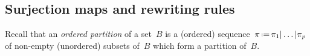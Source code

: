 \documentclass{amsart}
\theoremstyle{definition}
\newtheorem{definition}[theorem]{Definition}
\newcommand{\ssm}{\smallsetminus} %
\newcommand{\eqdef}{\mbox{\,\raisebox{0.2ex}{\scriptsize\ensuremath{\mathrm:}}\ensuremath{=}\,}} %
\newcommand{\darkblue}{\color{darkblue}} %
\newcommand{\defn}[1]{\textsl{\darkblue #1}} %
\newcommand{\vincent}[1]{\todo[color=blue!30]{#1 \\ \hfill --- V.}}
\begin{document}

\subsection{Surjection maps and rewriting rules}
\label{subsec:surjectionMaps}

Recall that an \defn{ordered partition} of a set~$B$ is a (ordered) sequence~$\pi \eqdef \pi_1 | \dots | \pi_p$ of non-empty (unordered) subsets of~$B$ which form a partition of~$B$.

\end{document}
